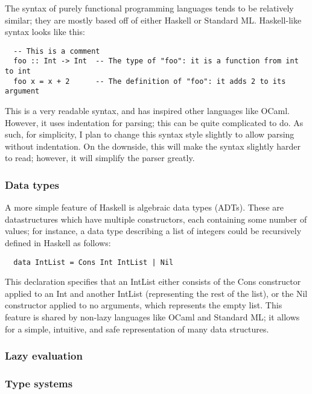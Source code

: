 \documentclass[9pt]{extarticle}
\begin{document}
The syntax of purely functional programming languages tends to be relatively
similar; they are mostly based off of either Haskell or Standard ML.
Haskell-like syntax looks like this:

\begin{verbatim}
  -- This is a comment
  foo :: Int -> Int  -- The type of "foo": it is a function from int to int
  foo x = x + 2      -- The definition of "foo": it adds 2 to its argument
\end{verbatim}

This is a very readable syntax, and has inspired other languages like OCaml.
However, it uses indentation for parsing; this can be quite complicated to do.
As such, for simplicity, I plan to change this syntax style slightly to allow
parsing without indentation. On the downside, this will make the syntax slightly
harder to read; however, it will simplify the parser greatly.

\subsubsection{Data types}

A more simple feature of Haskell is algebraic data types (ADTs). These are
datastructures which have multiple constructors, each containing some number of
values; for instance, a data type describing a list of integers could be
recursively defined in Haskell as follows: 

\begin{verbatim}
  data IntList = Cons Int IntList | Nil 
\end{verbatim}

This declaration specifies that an IntList either consists of the Cons
constructor applied to an Int and another IntList (representing the rest of the
list), or the Nil constructor applied to no arguments, which represents the
empty list. This feature is shared by non-lazy languages like OCaml and Standard
ML; it allows for a simple, intuitive, and safe representation of many data
structures. 

\subsubsection{Lazy evaluation}


\subsubsection{Type systems}
\end{document}
